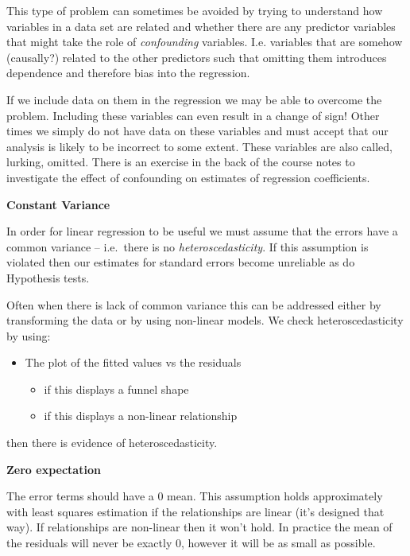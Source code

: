 \documentclass[
]{gitbook}
\providecommand{\tightlist}{%
  \setlength{\itemsep}{0pt}\setlength{\parskip}{0pt}}
\begin{document}

This type of problem can sometimes be avoided by trying to understand how variables in a data set are related and whether there are any predictor variables that might take the role of \emph{confounding} variables. I.e. variables that are somehow (causally?) related to the other predictors such that omitting them introduces dependence and therefore bias into the regression.

If we include data on them in the regression we may be able to overcome the problem. Including these variables can even result in a change of sign! Other times we simply do not have data on these variables and must accept that our analysis is likely to be incorrect to some extent. These variables are also called, lurking, omitted. There is an exercise in the back of the course notes to investigate the effect of confounding on estimates of regression coefficients.

\textbf{Constant Variance}

In order for linear regression to be useful we must assume that the errors have a common variance -- i.e.~there is no \emph{heteroscedasticity}. If this assumption is violated then our estimates for standard errors become unreliable as do Hypothesis tests.

Often when there is lack of common variance this can be addressed either by transforming the data or by using non-linear models. We check heteroscedasticity by using:

\begin{itemize}
\tightlist
\item
  The plot of the fitted values vs the residuals

  \begin{itemize}
  \tightlist
  \item
    if this displays a funnel shape
  \item
    if this displays a non-linear relationship
  \end{itemize}
\end{itemize}

then there is evidence of heteroscedasticity.

\textbf{Zero expectation}

The error terms should have a 0 mean. This assumption holds approximately with least squares estimation if the relationships are linear (it's designed that way). If relationships are non-linear then it won't hold. In practice the mean of the residuals will never be exactly 0, however it will be as small as possible.
\end{document}
